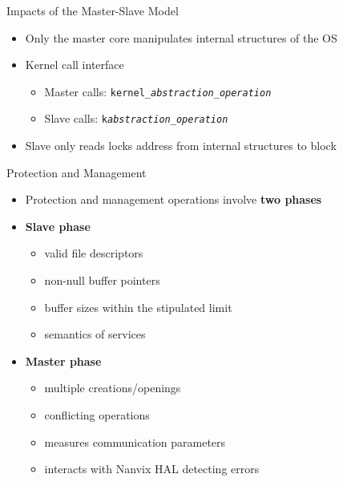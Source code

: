 		\begin{frame}[fragile]{Impacts of the Master-Slave Model}
			\begin{itemize}
				\item Only the master core manipulates internal structures of the OS
				\item Kernel call interface
				\begin{itemize}
					\item Master calls: \texttt{kernel\_\textit{abstraction}\_\textit{operation}}
					\item Slave calls: \texttt{k\textit{abstraction}\_\textit{operation}}
				\end{itemize}
				\item Slave only reads locks address from internal structures to block
			\end{itemize}

		\end{frame}

		\begin{frame}[fragile]{Protection and Management}
			\begin{itemize}
				\item Protection and management operations involve \textbf{two phases}
				\item \textbf{Slave phase}
				\begin{itemize}
					\item valid file descriptors
					\item non-null buffer pointers
					\item buffer sizes within the stipulated limit
					\item semantics of services
				\end{itemize}
				\item \textbf{Master phase}
				\begin{itemize}
					\item multiple creations/openings
					\item conflicting operations
					\item measures communication parameters
					\item interacts with Nanvix HAL detecting errors
				\end{itemize}
			\end{itemize}
		\end{frame}

